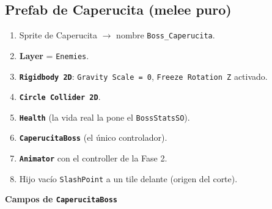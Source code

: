 \documentclass[a4paper,12pt]{article}
\newcommand{\code}[1]{\texttt{#1}}
\begin{document}
\subsection{Prefab de Caperucita (melee puro)}

\begin{enumerate}
    \item Sprite de Caperucita $\to$ nombre \code{Boss\_Caperucita}.
    \item \textbf{Layer} = \code{Enemies}.
    \item \textbf{\code{Rigidbody 2D}}: \code{Gravity Scale = 0}, \code{Freeze Rotation Z} activado.
    \item \textbf{\code{Circle Collider 2D}}.
    \item \textbf{\code{Health}} (la vida real la pone el \code{BossStatsSO}).
    \item \textbf{\code{CaperucitaBoss}} (el único controlador).
    \item \textbf{\code{Animator}} con el controller de la Fase 2.
    \item Hijo vacío \code{SlashPoint} a un tile delante (origen del corte).
\end{enumerate}

\textbf{Campos de \code{CaperucitaBoss}}
\end{document}
